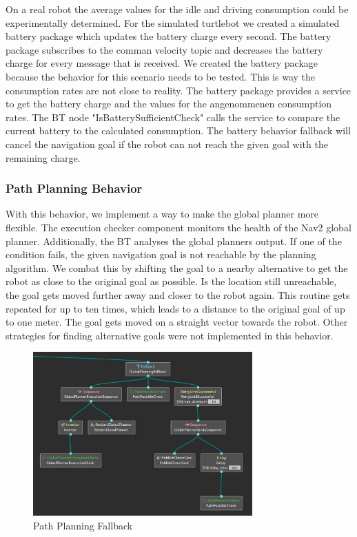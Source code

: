 On a real robot the average values for the idle and driving consumption could be experimentally determined. For the simulated turtlebot we created a simulated battery package which updates the battery charge every second. The battery package subscribes to the comman velocity topic and decreases the battery charge for every message that is received. We created the battery package because the behavior for this scenario needs to be tested. This is way the consumption rates are not close to reality.
The battery package provides a service to get the battery charge and the values for the angenommenen consumption rates. The BT node "IsBatterySufficientCheck" calls the service to compare the current battery to the calculated consumption. The battery behavior fallback will cancel the navigation goal if the robot can not reach the given goal with the remaining charge. \\

\subsubsection{Path Planning Behavior}

With this behavior, we implement a way to make the global planner more flexible. 
The execution checker component monitors the health of the Nav2 global planner. Additionally, the BT analyses the global planners output. If one of the condition fails, the given navigation goal is not reachable by the planning algorithm. We combat this by shifting the goal to a nearby alternative to get the robot as close to the original goal as possible. Is the location still unreachable, the goal gets moved further away and closer to the robot again. This routine gets repeated for up to ten times, which leads to a distance to the original goal of up to one meter. 
The goal gets moved on a straight vector towards the robot. Other strategies for finding alternative goals were not implemented in this behavior.

\begin{figure}
	\includegraphics[width=0.75\textwidth]{images/global_planning_fallback.png}
	\caption{Path Planning Fallback}
\end{figure}





